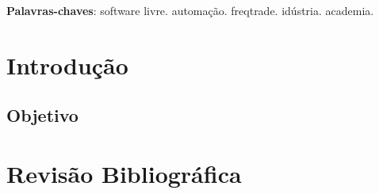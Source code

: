 \documentclass[
12pt,				%
openright,			%
oneside,			%
a4paper,			%
english,			%
french,				%
spanish,			%
brazil,				%
]{abntex2}
\begin{document}

\frenchspacing


\imprimircapa


\setlength{\absparsep}{18pt} %
\begin{resumo}
  
  
  \noindent
  \textbf{Palavras-chaves}: software livre. automação. freqtrade. idústria. academia.

\end{resumo}


\tableofcontents*


\textual

\chapter[Introdução]{Introdução}


\section{Objetivo}


\chapter{Revisão Bibliográfica}
\end{document}
